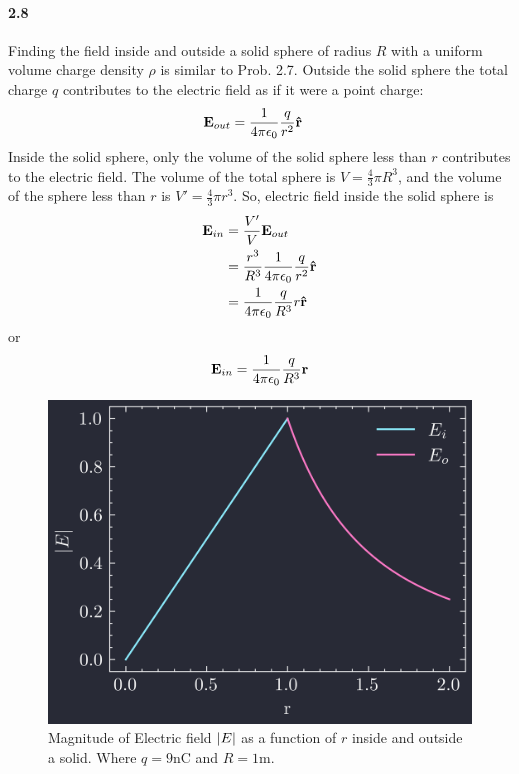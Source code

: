 \documentclass[../main.tex]{subfiles}
\begin{document}
\newpage
\paragraph{2.8}\label{hw:2_8}
Finding the field inside and outside a solid sphere of radius $R$ with a uniform volume charge
density $\rho$ is similar to Prob. 2.7. Outside the solid sphere the total charge $q$ contributes
to the electric field as if it were a point charge:
\begin{align*}
    \vb{E}_{out} &= \frac{1}{4\pi\epsilon_0} \frac{q}{r^2} \vu{r}
\end{align*}
Inside the solid sphere, only the volume of the solid sphere less than $r$ contributes to the
electric field. The volume of the total sphere is $V = \frac{4}{3}\pi R^3$, and the volume of the
sphere less than $r$ is $V' = \frac{4}{3}\pi r^3$. So, electric field inside the solid sphere is
\begin{align*} 
    \vb{E}_{in} &= \frac{V'}{V} \vb{E}_{out} \\
    &= \frac{r^3}{R^3} \frac{1}{4\pi\epsilon_0} \frac{q}{r^2} \vu{r} \\
    &= \frac{1}{4\pi\epsilon_0} \frac{q}{R^3} r \vu{r} 
\end{align*}
or
\begin{align*}
    \vb{E}_{in} = \frac{1}{4\pi\epsilon_0} \frac{q}{R^3} \vb{r}
\end{align*}
\begin{figure}[ht]
    \centering
    \includegraphics[width=0.8\linewidth]{images/hw2_8.png}
    \captionsetup{width=0.8\linewidth}
    \caption{Magnitude of Electric field $\abs{E}$ as a function of $r$ inside and outside a solid. Where $q = 9$nC and $R = 1$m.}
    \label{fig:2_8}
\end{figure}
\newpage
\end{document}
